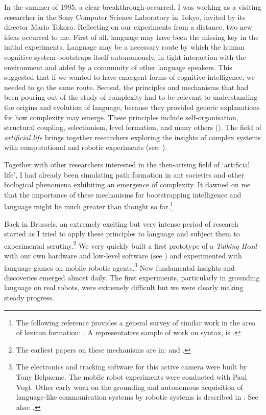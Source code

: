 In the summer of 1995, a clear breakthrough occurred.  
I was working as a visiting researcher in the Sony
Computer Science Laboratory in Tokyo, invited by its director
Mario Tokoro. Reflecting on our 
experiments from a distance, two new ideas occurred to me. 
First of all, language may have been the missing key
in the initial experiments. Language may 
be a necessary route by which the human cognitive system
bootstraps itself autonomously, in tight interaction with the
environment and aided by a community of other
language speakers. This suggested that if we wanted
to have emergent
forms of cognitive intelligence, we needed to go the same 
route. Second, the principles and mechanisms that had been
pouring out of the study of complexity had to be
relevant to understanding the origins and evolution of language,
because they provided generic explanations for how complexity 
may emerge. These principles include 
self-organisation, structural coupling, 
selectionism, level formation, 
and many others (\citealt{Nicolis:1989}). The field of {\it artificial life} brings together researchers
exploring the insights of complex systems with computational
and robotic experiments (see: \citealt{Langton:1995}).

Together with 
other researchers interested in the then-arising field of `artificial life', I had 
already been simulating path formation in 
ant societies and other biological phenomena exhibiting 
an emergence of complexity. It dawned on me that the
importance of these mechanisms for bootstrapping intelligence and
language might be much greater than 
thought so far.\footnote{The following reference provides a general survey of similar work in 
the area of lexicon formation: \cite{Steels:97b}. 
A representative sample of work on syntax, is \cite{Briscoe:1999}.}

Back in Brussels, an extremely exciting but very 
intense period of research started as I tried to 
apply these principles to language
and subject them to experimental 
scrutiny.\footnote{The earliest papers on these mechanisms are in: \cite{Steels:95b} and 
\cite{Steels:96a}.}
We very quickly built a first 
prototype of a {\it Talking Head} with our own hardware
and low-level software (see ) 
and experimented with language games on mobile 
robotic agents.\footnote{The electronics and tracking software for this 
active camera were built by Tony Belpaeme. The mobile
robot experiments were conducted with Paul Vogt. 
Other early work on the grounding and autonomous acquisition of 
language-like communication systems by robotic systems is 
described in \cite{Steels:97g}. See also: \cite{Billard:1998}.}
New fundamental insights and discoveries emerged almost daily. 
The first experiments, particularly in grounding
language on real robots, were extremely difficult but we 
were clearly making steady progress. 


